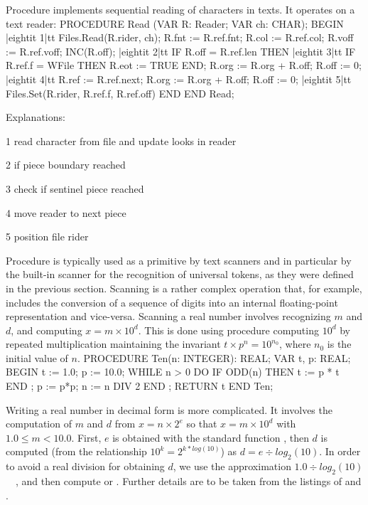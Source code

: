 \noindent Procedure  implements sequential reading of characters in texts. It operates on a text reader:
\begintt
PROCEDURE Read (VAR R: Reader; VAR ch: CHAR);
BEGIN
|eightit 1|tt Files.Read(R.rider, ch);
  R.fnt := R.ref.fnt;
  R.col := R.ref.col;
  R.voff := R.ref.voff;
  INC(R.off);
|eightit 2|tt IF R.off = R.ref.len THEN
|eightit 3|tt   IF R.ref.f = WFile THEN R.eot := TRUE END;
    R.org := R.org + R.off; R.off := 0;
|eightit 4|tt   R.ref := R.ref.next; R.org := R.org + R.off; R.off := 0;
|eightit 5|tt   Files.Set(R.rider, R.ref.f, R.ref.off)
  END
END Read;
\endtt

\noindent Explanations:

\item{1} read character from file and update looks in reader
\item{2} if piece boundary reached
\item{3} check if sentinel piece reached
\item{4} move reader to next piece
\item{5} position file rider

\noindent Procedure  is typically used as a primitive by text scanners and in particular by the built-in scanner  for the recognition of universal tokens, as they were defined in the previous section. Scanning is a rather complex operation that, for example, includes the conversion of a sequence of digits into an internal floating-point representation and vice-versa. Scanning a real number involves recognizing $m$ and $d$, and computing $x = m \times 10^d$. This is done using procedure  computing $10^d$ by repeated multiplication maintaining the invariant $t \times p^n = 10^{n_0}$, where $n_0$ is the initial value of $n$.
\begintt
PROCEDURE Ten(n: INTEGER): REAL;
  VAR t, p: REAL;
BEGIN
  t := 1.0;
  p := 10.0;
  WHILE n > 0 DO
    IF ODD(n) THEN t := p * t END ;
    p := p*p;
    n := n DIV 2
  END ;
  RETURN t
END Ten;
\endtt

\noindent Writing a real number in decimal form is more complicated. It involves the computation of $m$ and $d$ from $x = n \times 2^e$ so that $x = m \times 10^d$ with $1.0 \le m < 10.0$. First, $e$ is obtained with the standard function , then $d$ is computed (from the relationship
$10^k = 2^{k*log(10)}$) as $d = e \div log_2(10)$.
In order to avoid a real division for obtaining $d$,
we use the approximation $1.0 \div log_2(10) $~\approx~,
and then compute
 or .
Further details are to be taken from the listings of  and .

